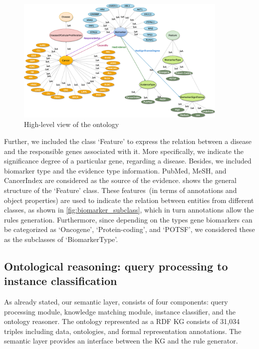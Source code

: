 \begin{figure}
	\centering
	\includegraphics[width=0.8\linewidth,height=60mm]{images/diagram_general_view.png}
	\caption{High-level view of the ontology} 
	\label{fig:main_ontology}
\end{figure}

\hspace*{3.5mm} Further, we included the class `Feature' to express the relation between a disease and the responsible genes associated with it. More specifically, we indicate the significance degree of a particular gene, regarding a disease. Besides, we included biomarker type and the evidence type information. PubMed, MeSH, and CancerIndex are considered as the source of the evidence.  shows the general structure of the `Feature' class. These features~(in terms of annotations and object properties) are used to indicate the relation between entities from different classes, as shown in \cref{fig:biomarker_subclass}, which in turn annotations allow the rules generation. Furthermore, since depending on the types gene biomarkers can be categorized as `Oncogene', `Protein-coding', and `POTSF', we considered these as the subclasses of `BiomarkerType'. 

\subsection{Ontological reasoning: query processing to instance classification}
As already stated, our semantic layer, consists of four components: query processing module, knowledge matching module, instance classifier, and the ontology reasoner. The ontology represented as a RDF KG consists of 31,034 triples including data, ontologies, and formal representation annotations. The semantic layer provides an interface between the KG and the rule generator. %

